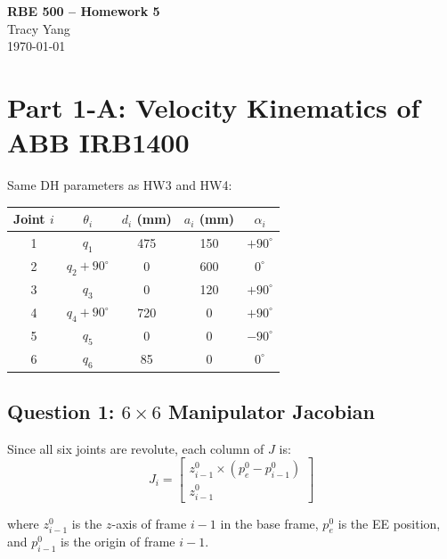 \documentclass[12pt]{article}
\begin{document}
\begin{center}
    {\LARGE \textbf{RBE 500 -- Homework 5}} \\[6pt]
    {\large Tracy Yang} \\[4pt]
    {\large \today}
\end{center}

\section{Part 1-A: Velocity Kinematics of ABB IRB1400}

Same DH parameters as HW3 and HW4:

\begin{center}
\renewcommand{\arraystretch}{1.3}
\begin{tabular}{ccccc}
\toprule
Joint $i$ & $\theta_i$ & $d_i$ (mm) & $a_i$ (mm) & $\alpha_i$ \\
\midrule
1 & $q_1$                & 475 & 150 & $+90^\circ$ \\
2 & $q_2 + 90^\circ$     &   0 & 600 & $0^\circ$   \\
3 & $q_3$                &   0 & 120 & $+90^\circ$ \\
4 & $q_4 + 90^\circ$     & 720 &   0 & $+90^\circ$ \\
5 & $q_5$                &   0 &   0 & $-90^\circ$ \\
6 & $q_6$                &  85 &   0 & $0^\circ$   \\
\bottomrule
\end{tabular}
\end{center}

\subsection{Question 1: $6 \times 6$ Manipulator Jacobian}

Since all six joints are revolute, each column of $J$ is:
\[
J_i =
\begin{bmatrix}
z_{i-1}^0 \times (p_e^0 - p_{i-1}^0) \\[4pt]
z_{i-1}^0
\end{bmatrix}
\]

where $z_{i-1}^0$ is the $z$-axis of frame $i-1$ in the base frame,
$p_e^0$ is the EE position, and $p_{i-1}^0$ is the origin of frame $i-1$.
\end{document}

